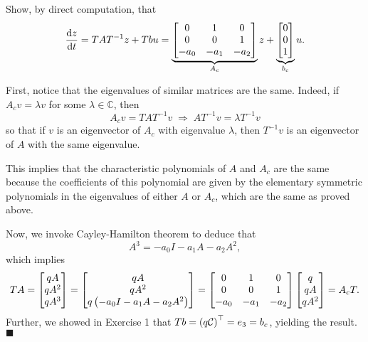 \question Show, by direct computation, that
\[
\frac{\operatorname{d}\! z}{\operatorname{d}\! t} = TAT^{-1} z + Tbu = \underbrace{\begin{bmatrix}
    0 & 1 & 0 \\ 0 & 0 & 1 \\ -a_0 & -a_1 & -a_2
\end{bmatrix}}_{A_c}z + \underbrace{\begin{bmatrix}0 \\ 0 \\ 1\end{bmatrix}}_{b_c}u.
\]

\begin{solution}
%
First, notice that the eigenvalues of similar matrices are the same. Indeed, if 
$A_c v = \lambda v$ for some $\lambda \in \mathbb{C}$, then 
\[A_c v = TAT^{-1}v \; \Longrightarrow \; AT^{-1}v = \lambda T^{-1}v \] so that if $v$ is
an eigenvector of $A_c$ with eigenvalue $\lambda$, then $T^{-1}v$ is an
eigenvector of $A$ with the same eigenvalue. 

This implies that the characteristic polynomials of $A$ and $A_c$ are the same
because the coefficients of this polynomial are given by the elementary
symmetric polynomials in the eigenvalues of either $A$ or $A_c$, which are the
same as proved above.

Now, we invoke Cayley-Hamilton theorem to deduce that 
\[ A^3 = -a_0 I - a_1A -a_2A^2, \] which implies 
\[ TA = \begin{bmatrix}qA \\ qA^2 \\ qA^3\end{bmatrix} = \begin{bmatrix}qA \\ qA^2 \\ q\left( -a_0I -a_1A
-a_2A^2 \right)\end{bmatrix} = \begin{bmatrix}0 & 1 & 0 \\ 0 & 0 & 1 \\ -a_0 & -a_1 & -a_2\end{bmatrix}\begin{bmatrix}q \\
qA \\ qA^2\end{bmatrix} = A_cT. \] Further, we showed in Exercise 1 that $Tb = \left(q
\mathcal{C}\right)^\top = e_3 = b_c$, yielding the result. \hfill $\blacksquare$
%
\end{solution}